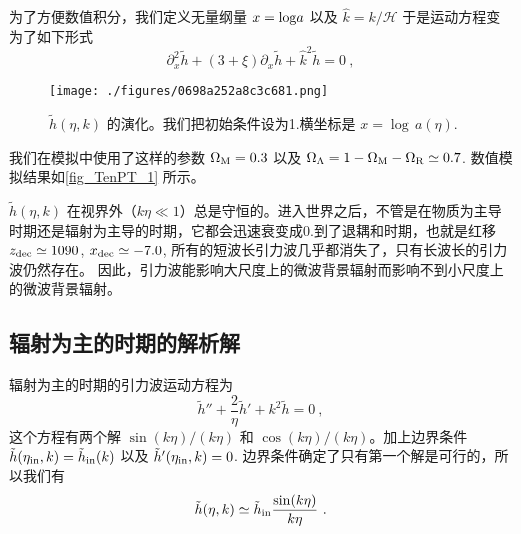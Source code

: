 为了方便数值积分，我们定义无量纲量 $x = {\rm log} a$ 以及 $\hat k = k/\mathcal H$ 于是运动方程变为了如下形式
\begin{equation}
\partial^2_x \tilde h + (3+\xi) \partial_x \tilde h + \hat k^2 \tilde h = 0 ~,
\end{equation}
\begin{figure}[ht]
\centering
\texttt{[image: ./figures/0698a252a8c3c681.png]}
\caption{$\tilde h(\eta,k)$ 的演化。我们把初始条件设为1.横坐标是 $x = {\log} \, a (\eta).$} \label{fig_TenPT_1}
\end{figure}
我们在模拟中使用了这样的参数 $\Omega_{\rm M}=0.3$ 以及 $\Omega_{\Lambda} = 1 - \Omega_{\rm M} - \Omega_{\rm R} \simeq 0.7$. 数值模拟结果如\autoref{fig_TenPT_1} 所示。

$\tilde h(\eta,k)$ 在视界外（$k\eta\ll 1$）总是守恒的。进入世界之后，不管是在物质为主导时期还是辐射为主导的时期，它都会迅速衰变成0.到了退耦和时期，也就是红移 $z_{\rm dec} \simeq 1090$, $x_{\rm dec}\simeq -7.0$, 所有的短波长引力波几乎都消失了，只有长波长的引力波仍然存在。 因此，引力波能影响大尺度上的微波背景辐射而影响不到小尺度上的微波背景辐射。

\subsection{辐射为主的时期的解析解}
辐射为主的时期的引力波运动方程为
\begin{equation}
\tilde h'' + \frac{2}{\eta} \tilde h' + k^2 \tilde h = 0~,
\end{equation}
这个方程有两个解 $\sin(k\eta)/(k\eta)$ 和 $\cos(k\eta)/(k\eta)$。加上边界条件 $\tilde h(\eta_{\rm in},k) = \tilde h_{\rm in} (k)$ 以及 $\tilde h'(\eta_{\rm in},k) = 0$. 边界条件确定了只有第一个解是可行的，所以我们有
\begin{equation}
\tilde h (\eta, k) \simeq \tilde h_{\rm in} \frac{\sin(k\eta)}{k\eta} ~.
\end{equation}

